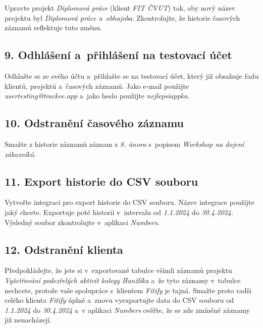 Upravte projekt \emph{Diplomová práce} (klient \emph{FIT ČVUT}) tak, aby nový název projektu byl \emph{Diplomová práce a~obhajoba}. Zkontrolujte, že historie časových záznamů reflektuje tuto změnu.

\subsection*{9. Odhlášení a~přihlášení na testovací účet}

Odhlašte se ze svého účtu a~přihlašte se na testovací účet, který již obsahuje řadu klientů, projektů a~časových záznamů. Jako e-mail použijte \emph{usertesting@trackee.app} a~jako heslo použijte \emph{nejlepsiappka}.

\subsection*{10. Odstranění časového záznamu}

Smažte z historie záznamů záznam z \emph{8. února} s~popisem \emph{Workshop na dojení zákazníků}.

\subsection*{11. Export historie do CSV souboru}

Vytvořte integraci pro export historie do CSV souboru. Název integrace použijte jaký chcete. Exportuje poté historii v~intervalu od \emph{1.1.2024} do \emph{30.4.2024}. Výsledný soubor zkontrolujte v aplikaci \emph{Numbers}.

\subsection*{12. Odstranění klienta}

Předpokládejte, že jste si v~exportované tabulce všimli záznamů projektu \emph{Vyšetřování podezřelých aktivit kolegy Hanžlíka} a~že tyto záznamy v~tabulce nechcete, protože vaše spolupráce s~klientem \emph{Fitify} je tajná. Smažte proto radši celého klienta \emph{Fitify} úplně a~znovu vyexportujte data do CSV souboru od \emph{1.1.2024} do \emph{30.4.2024} a~v aplikaci \emph{Numbers} ověřte, že se zde zmíněné záznamy již nenacházejí.

